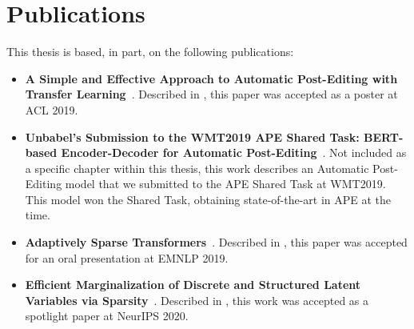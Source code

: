 \section{Publications}
\label{sec:int_publications}

\noindent This thesis is based, in part, on the following publications:

\begin{sloppypar}
    \begin{itemize}

        \item {\bf A Simple and Effective Approach to Automatic
              Post-Editing with Transfer Learning}~\citep{Correia2019}.
              Described in , this paper was accepted as a
              poster at ACL 2019.
              
        \item {\bf Unbabel's Submission to the WMT2019 APE Shared Task:
              BERT-based Encoder-Decoder for Automatic
              Post-Editing}~\citep{Lopes2019}. Not included as a specific
              chapter within this thesis, this work describes an Automatic
              Post-Editing model that we submitted to the APE Shared Task at
              WMT2019. This model won the Shared Task, obtaining state-of-the-art
              in APE at the time.
              
        \item {\bf Adaptively Sparse
              Transformers}~\citep{correia2019adaptively}. Described in
              , this paper was accepted for an oral
              presentation at EMNLP 2019.
              
        \item {\bf Efficient Marginalization of Discrete and Structured
              Latent Variables via Sparsity}~\citep{correia2020procneurips}.
              Described in , this work was
              accepted as a spotlight paper at NeurIPS 2020.
              
    \end{itemize}
\end{sloppypar}